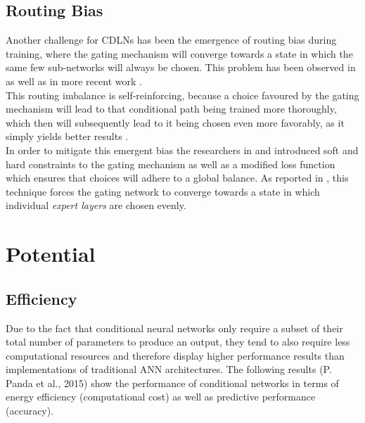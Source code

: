 \clearpage


\subsection{Routing Bias} \label{subsec_routing-bias}

Another challenge for \acp{CDLN} has been the emergence of routing bias during training, where the gating mechanism will converge towards a state in which the same few sub-networks will always be chosen. This problem has been observed in
\cite{24_MoE-eigen2014} as well as in more recent work
\cite{14_sparsely-gated-experts_2017}. \\

This routing imbalance is self-reinforcing, because a choice favoured by
the gating mechanism will lead to that conditional path being trained more
thoroughly, which then will subsequently lead to it being chosen even more favorably, as it simply yields better results \cite[p. 5]{14_sparsely-gated-experts_2017}\cite[p. 2]{24_MoE-eigen2014}. \\ 

In order to mitigate this emergent bias the researchers in \cite{24_MoE-eigen2014} and
\cite{14_sparsely-gated-experts_2017} 
introduced soft and hard constraints to the gating mechanism
as well as a modified loss function which ensures that choices will
adhere to a global balance. As reported in \cite{14_sparsely-gated-experts_2017}, this 
technique forces the gating network to converge towards a state in which individual
\textit{expert layers} are chosen evenly.


\clearpage

\section{Potential}

\subsection{Efficiency}

Due to the fact that conditional neural networks only require a subset of their total number of parameters to produce an output, they tend to also require less computational resources and therefore display higher performance results than implementations of traditional ANN architectures.
The following results (P. Panda et al., 2015)\cite[p. 12]{8_CDL-4-efficient_2015} show the performance of conditional networks in terms of energy efficiency (computational cost) 
as well as predictive performance (accuracy).


